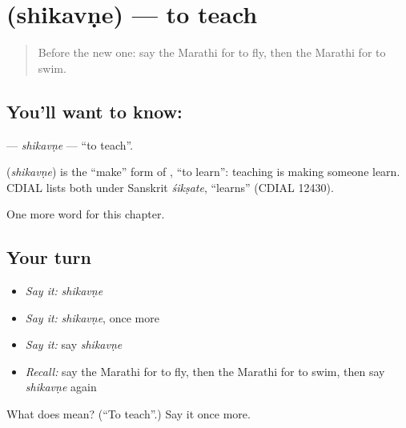 \section[\texorpdfstring{\mr{शिकवणे} (shikavṇe)}{शिकवणे (shikavṇe)}]{ (shikavṇe) — to teach}

\label{lesson:MR-C82-shikavne}



\begin{quote}
Before the new one: say the Marathi for to fly, then the Marathi for to swim.
\end{quote}

\subsection*{You'll want to know: }
\textbf{} — \emph{shikavṇe} — \textquotedblleft{}to teach\textquotedblright{}.

\begin{cousinweb}
\textbf{} (\emph{shikavṇe}) is the \textquotedblleft{}make\textquotedblright{} form of \textbf{}, \textquotedblleft{}to learn\textquotedblright{}: teaching is making someone learn. CDIAL lists both under Sanskrit \emph{śikṣate}, \textquotedblleft{}learns\textquotedblright{} (CDIAL 12430).
\end{cousinweb}

\begin{grammarlens}[title={What you've built}]
One more word for this chapter.
\end{grammarlens}

\subsection*{Your turn}
\begin{itemize}
\raggedright
  \item \emph{Say it:} \emph{shikavṇe}
  \item \emph{Say it:} \emph{shikavṇe}, once more
  \item \emph{Say it:} say \emph{shikavṇe}
  \item \emph{Recall:} say the Marathi for to fly, then the Marathi for to swim, then say \emph{shikavṇe} again
\end{itemize}

\begin{tcolorbox}[breakable,colback=teal!4,colframe=teal!35!black,title={Before you move on}]
What does  mean? (\textquotedblleft{}To teach\textquotedblright{}.) Say it once more.
\end{tcolorbox}
